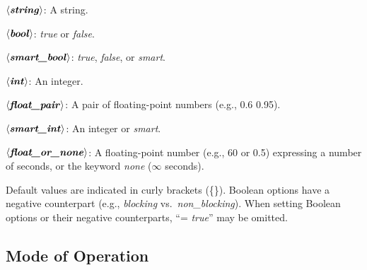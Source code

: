 \documentclass[a4paper,12pt]{article}
\def\qtybf#1{$\mathbf{\left<\textbf{\textit{#1\/}}\right>}$}
\begin{document}
\begin{enum}
\item[\labelitemi] \qtybf{string}: A string.
\item[\labelitemi] \qtybf{bool\/}: \textit{true} or \textit{false}.
\item[\labelitemi] \qtybf{smart\_bool\/}: \textit{true}, \textit{false}, or
\textit{smart}.
\item[\labelitemi] \qtybf{int\/}: An integer.
\item[\labelitemi] \qtybf{float\_pair\/}: A pair of floating-point numbers
(e.g., 0.6 0.95).
\item[\labelitemi] \qtybf{smart\_int\/}: An integer or \textit{smart}.
\item[\labelitemi] \qtybf{float\_or\_none\/}: A floating-point number (e.g., 60 or
0.5) expressing a number of seconds, or the keyword \textit{none} ($\infty$
seconds).
\end{enum}

Default values are indicated in curly brackets (\textrm{\{\}}). Boolean options
have a negative counterpart (e.g., \textit{blocking} vs.\
\textit{non\_blocking}). When setting Boolean options or their negative
counterparts, ``= \textit{true\/}'' may be omitted.

\subsection{Mode of Operation}
\label{mode-of-operation}
\end{document}
